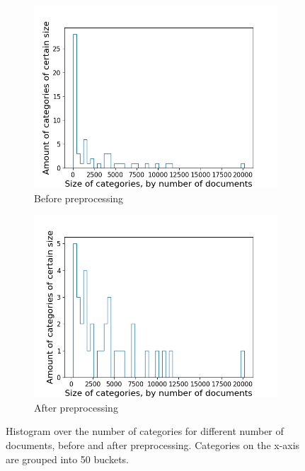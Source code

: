 \begin{figure}[ht]
	\centering
	\begin{subfigure}{0.45\textwidth}
		\centering
		\includegraphics[width=\linewidth]{figures/category_hist2_before.png}
		\caption{Before preprocessing}
		\label{fig:category_hist_before}
	\end{subfigure}
	\begin{subfigure}{0.45\textwidth}
		\centering
		\includegraphics[width=\linewidth]{figures/category_hist2_140.png}
		\caption{After preprocessing}
		\label{fig:category_hist_after}
	\end{subfigure}
	\caption{Histogram over the number of categories for different number of documents, before and after preprocessing.
	Categories on the x-axis are grouped into 50 buckets.}
	\label{fig:category_hist}
\end{figure}


